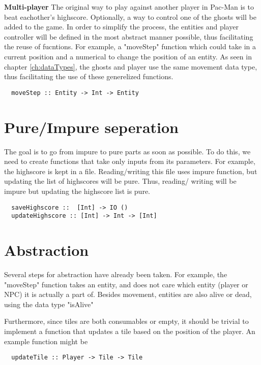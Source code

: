\documentclass[11pt]{Article}
\begin{document}
\textbf{Multi-player} The original way to play against another player in Pac-Man is to beat eachother's highscore. Optionally, a way to control one of the ghosts will be added to the game. In order to simplify the process, the entities and player controller will be defined in the most abstract manner possible, thus facilitating the reuse of fucntions. For example, a "moveStep" function which could take in a current position and a numerical to change the position of an entity. As seen in chapter \ref{ch:dataTypes}, the ghosts and player use the same movement data type, thus facilitating the use of these generelized functions.

\begin{lstlisting}
  moveStep :: Entity -> Int -> Entity
\end{lstlisting}


\section{Pure/Impure seperation} \label{ch:pureSeperation}
The goal is to go from impure to pure parts as soon as possible. To do this, we need to create functions that take only inputs from its parameters. For example, the highscore is kept in a file. Reading/writing this file uses impure function, but updating the list of highscores will be pure. Thus, reading/ writing will be impure but updating the highscore list is pure.

\begin{lstlisting}
  saveHighscore ::  [Int] -> IO ()
  updateHighscore :: [Int] -> Int -> [Int]
\end{lstlisting}

\section{Abstraction} \label{ch:abstraction}
Several steps for abstraction have already been taken. For example, the "moveStep" function takes an entity, and does not care which entity (player or NPC) it is actually a part of. Besides movement, entities are also alive or dead, using the data type "isAlive" 

Furthermore, since tiles are both consumables or empty, it should be trivial to implement a function that updates a tile based on the position of the player. An example function might be

\begin{lstlisting}
  updateTile :: Player -> Tile -> Tile
\end{lstlisting}







\end{document}
